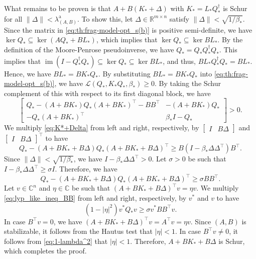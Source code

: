 \documentclass[9pt,shortpaper,twoside,web]{ieeecolor}
\DeclareMathOperator{\im}{im}
\newcommand{\R}{\mathbb{R}}
\begin{document}
What remains to be proven is that $A+B(K_*+\Delta)$ with \mbox{$K_*=L_*Q_*^{\dagger}$} is Schur for all $\| \Delta \| < \lambda_{(A,B)}^{\text{a}}$. To show this, let $\Delta \in \R^{m \times n}$ satisfy $\|\Delta\|<\sqrt{1/\beta_*}$. Since the matrix in \eqref{eq:th:frag-model-opt_s(b)} is positive semi-definite, we have $\ker Q_* \subseteq \ker(AQ_*+BL_*)$, which implies that $\ker Q_* \subseteq \ker BL_*$. By the definition of the Moore-Penrose pseudoinverse, we have \mbox{$Q_*=Q_*Q_*^{\dagger}Q_*$}. This implies that $\im (I-Q_*^{\dagger}Q_*) \subseteq \ker Q_* \subseteq \ker BL_*$, and thus, \mbox{$BL_*Q_*^{\dagger}Q_*=BL_*$}. Hence, we have $BL_*=BK_*Q_*$. By substituting $BL_*=BK_*Q_*$ into \eqref{eq:th:frag-model-opt_s(b)}, we have $\mathcal{L}(Q_*,K_*Q_*,\beta_*)\geq 0$. By taking the Schur complement of this with respect to its first diagonal block, we have
\begin{equation}
\label{eq:K*+Delta}
    \begin{bmatrix}
        Q_*\!-\!(A\!+\!BK_*) Q_* (A\!+\!BK_*)^{\!\top}\!-\!BB^\top & -(A\!+\!BK_*) Q_* \\
        -Q_* (A\!+\!BK_*)^\top & \beta_* I- Q_*
    \end{bmatrix} \!>0.
\end{equation} We multiply \eqref{eq:K*+Delta} from left and right, respectively, by $\begin{bmatrix}
    I & B\Delta
\end{bmatrix}$ and $\begin{bmatrix}
    I & B\Delta
\end{bmatrix}^\top$ to have
\begin{equation}
Q_*-(A+BK_*+B\Delta)Q_*(A+BK_*+B\Delta)^{\!\top} \!\!\geq\!\! B\!\left(\!I\!-\!\beta_*\Delta \Delta^{\!\top}\!\right)\!B^\top\!.
\end{equation}
Since $\|\Delta\|<\sqrt{1/\beta_*}$, we have $I-\beta_*\Delta \Delta^{\top}>0$. Let $\sigma>0$ be such that $I-\beta_*\Delta \Delta^{\top}\geq\sigma I$. Therefore, we have
\begin{equation}
\label{eq:lyp_like_ineq_BB}
Q_*-(A+BK_*+B\Delta)Q_*(A+BK_*+B\Delta)^{\top} \geq \sigma BB^\top.
\end{equation}
Let $v\in \mathbb{C}^n$ and $\eta \in \mathbb{C}$ be such that $(A+BK_*+B\Delta)^\top v=\eta v$. We multiply \eqref{eq:lyp_like_ineq_BB} from left and right, respectively, by $v^*$ and $v$ to have
\begin{equation}
\label{eq:1-lambda^2}
(1-|\eta|^2)v^*Q_*v \geq \sigma v^*BB^\top v.
\end{equation}
In case $B^\top v=0$, we have $(A+BK_*+B\Delta)^\top v =A^\top v=\eta v$. Since $(A,B)$ is stabilizable, it follows from the Hautus test that $|\eta|<1$. In case $B^\top v\neq0$, it follows from \eqref{eq:1-lambda^2} that $|\eta|<1$. Therefore, $A+BK_*+B\Delta$ is Schur, which completes the proof. \hfill \QED
\end{document}
